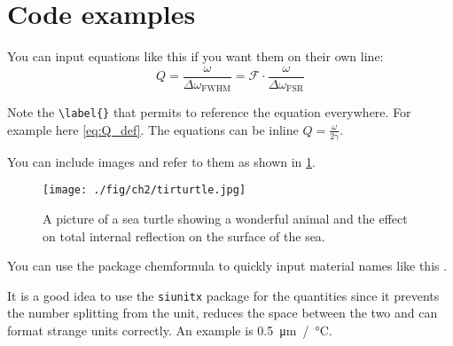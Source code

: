 \section{Code examples}
\label{sec:code_examples}

You can input equations like this if you want them on their own line:
\begin{equation}\label{eq:Q_def}
	\boxed{Q=\frac{\omega}{\Delta \omega_\mathrm{FWHM}}=\mathcal{F} \cdot \frac{\omega}{\Delta \omega_\mathrm{FSR}}}
\end{equation}

Note the \verb|\label{}| that permits to reference the equation everywhere. For example here \cref{eq:Q_def}. The equations can be inline $ Q=\frac{\omega}{2 \gamma} $.

You can include images and refer to them as shown in \cref{fig:turtle}.

\begin{figure}[ht]
	\centering
	\texttt{[image: ./fig/ch2/tirturtle.jpg]}
	\caption{\label{fig:turtle} A picture of a sea turtle showing a wonderful animal and the effect on total internal reflection on the surface of the sea.}
\end{figure}

You can use the package chemformula to quickly input material names like this .

It is a good idea to use the \verb|siunitx| package for the quantities since it prevents the number splitting from the unit, reduces the space between the two and can format strange units correctly. An example is \SI{0.5}{\micro m / \celsius}.